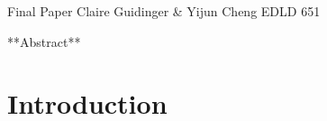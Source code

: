 \documentclass[
  12pt,
]{article}
\author{}
\date{\vspace{-2.5em}}
\begin{document}
\allsectionsfont{\centering}
\subsectionfont{\raggedright}
\subsubsectionfont{\raggedright}


\begin{centering}
\vspace{24pt}
Final Paper
Claire Guidinger & Yijun Cheng
EDLD 651
\end{centering}

\newpage

\begin{centering}
**Abstract**
\end{centering}

\newpage
{}

\hypertarget{introduction}{%
\section{\texorpdfstring{\textbf{Introduction}}{Introduction}}\label{introduction}}
\end{document}
